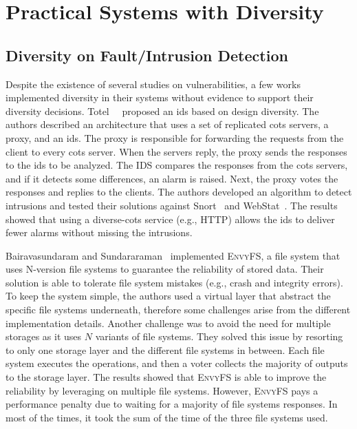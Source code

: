 \section{Practical Systems with Diversity}

\subsection{Diversity on Fault/Intrusion Detection}
Despite the existence of several studies on vulnerabilities, a few works implemented diversity in their systems without evidence to support their diversity decisions.
Totel~\etal{}~\cite{Totel:2005} proposed an \gls{ids} based on design diversity.
The authors described an architecture that uses a set of replicated \gls{cots} servers, a proxy, and an \gls{ids}. 
The proxy is responsible for forwarding the requests from the client to every \gls{cots} server. 
When the servers reply, the proxy sends the responses to the \gls{ids} to be analyzed. 
The IDS compares the responses from the \gls{cots} servers, and if it detects some differences, an alarm is raised. 
Next, the proxy votes the responses and replies to the clients. 
The authors developed an algorithm to detect intrusions and tested their solutions against Snort~\cite{snort} and WebStat~\cite{Vigna:2003}. 
The results showed that using a diverse-\gls{cots} service (e.g., HTTP) allows the \gls{ids} to deliver fewer alarms without missing the intrusions.

Bairavasundaram and Sundararaman~\cite{Bairavasundaram:2009} implemented \textsc{EnvyFS}, a file system that uses N-version file systems to guarantee the reliability of stored data.
Their solution is able to tolerate file system mistakes (e.g., crash and integrity errors). 
To keep the system simple, the authors used a virtual layer that abstract the specific file systems underneath, therefore some challenges arise from the different implementation details.
Another challenge was to avoid the need for multiple storages as it uses $N$ variants of file systems. 
They solved this issue by resorting to only one storage layer and the different file systems in between. 
Each file system executes the operations, and then a voter collects the majority of outputs to the storage layer.
The results showed that \textsc{EnvyFS} is able to improve the reliability by leveraging on multiple file systems.
However, \textsc{EnvyFS} pays a performance penalty due to waiting for a majority of file systems responses. 
In most of the times, it took the sum of the time of the three file systems used.

